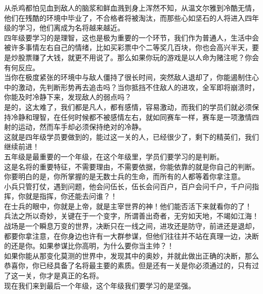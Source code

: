 \begin{multicols}{\theparacolNo}
从杀鸡都怕见血到敌人的脑浆和鲜血溅到身上浑然不知，从温文尔雅到冷酷无情，他们在残酷的环境中毕业了，不合格者将被淘汰，而那些心如坚石的人将进入四年级的学习，他们离成为名将越来越近。\\

四年级要学习的是理智，这也是极为重要的一个环节，我们作为普通人，生活中会被许多事情左右自己的情绪，比如买彩票中个二等奖几百块，你也会高兴半天，要是炒股票赚了大钱，就更不用说了。那么如果你玩的游戏是以人命为赌注呢？你会有何反应。\\

当你在极度紧张的环境中与敌人僵持了很长时间，突然敌人退却了，你能遏制住心中的激动，先判断形势再去追击吗？当你抵挡不住敌人的进攻，全军即将崩溃时，你能及时冷静下来，发现敌人的弱点吗？\\

是的，这太难了，我们都是凡人，都有感情，容易激动，而我们的学员们就必须保持冷静和理智，在任何时候都不被感情左右，就如同赛车一样，赛车是一项激情四射的运动，然而车手却必须保持绝对的冷静。\\

这就是四年级学员要做到的，能过这一关的人，已经很少了，剩下的精英们，我们继续前进！\\

五年级是最重要的一个年级，在这个年级里，学员们要学习的是判断。\\

这是名将的重要特征，不需要理由，不需要依据，你能依靠的就是你自己的判断。你要明白的是，你所掌握的是无数士兵的生命，而所有的人都等着你拿注意。\\

小兵只管打仗，遇到问题，他会问伍长，伍长会问百户，百户会问千户，千户问指挥，你就是指挥，你还能去问谁？！\\

在士兵的眼中，你就是上帝，就是主宰世界的神！他们能否活下来就看你的了！\\

兵法之所以奇妙，关键在于一个变字，所谓善出奇者，无穷如天地，不竭如江海！战场是一个瞬息万变的世界，决断只在一线之间，进攻还是防守，前进还是退却，都要你拿注意，在你身边也许有一大群参谋，但他们往往并不站在真理一边，决断的还是你。如果参谋比你高明，为什么要你当主帅？！\\

如果你能从那变化莫测的世界中，发现其中的奥妙，并就此做出正确的决断，那么恭喜你，你已经具备了名将最主要的素质。但是还有一关是你必须通过的，只有过了这一关，你才是真正的名将。\\

现在我们来到最后一个年级，这个年级我们要学习的是坚强。\\


\end{multicols}

